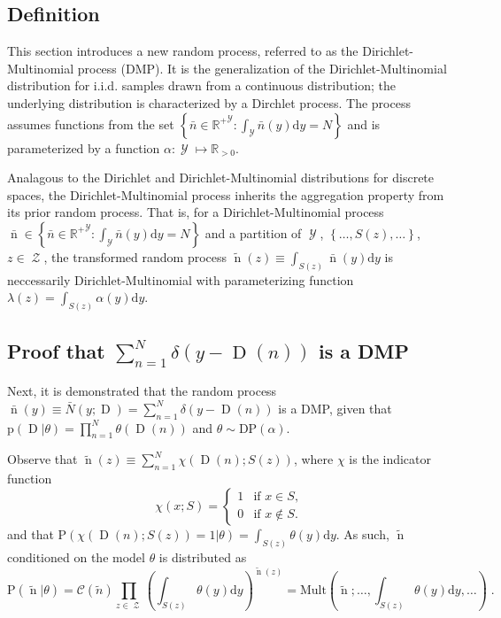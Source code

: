 \documentclass[12pt]{report}
\DeclareMathOperator{\Drm}{\mathrm{D}}
\DeclareMathOperator{\nrm}{\mathrm{n}}
\DeclareMathOperator{\Ycal}{\mathcal{Y}}
\DeclareMathOperator{\Zcal}{\mathcal{Z}}
\begin{document}
\subsection{Definition}

This section introduces a new random process, referred to as the Dirichlet-Multinomial process (DMP). It is the generalization of the Dirichlet-Multinomial distribution for i.i.d. samples drawn from a continuous distribution; the underlying distribution is characterized by a Dirchlet process. The process assumes functions from the set $\left\{ \bar{n} \in {\mathbb{R}^+}^{\Ycal} : \int_{\Ycal} \bar{n}(y) \mathrm{d} y = N \right\}$ and is parameterized by a function $\alpha : \Ycal \mapsto \mathbb{R}_{>0}$.

Analagous to the Dirichlet and Dirichlet-Multinomial distributions for discrete spaces, the Dirichlet-Multinomial process inherits the aggregation property from its prior random process. That is, for a Dirichlet-Multinomial process $\bar{\nrm} \in \left\{ \bar{n} \in {\mathbb{R}^+}^{\Ycal} : \int_{\Ycal} \bar{n}(y) \mathrm{d} y = N \right\}$ and a partition of $\Ycal$, $\left\{ \ldots,S(z),\ldots \right\}$, $z \in \Zcal$, the transformed random process $\tilde{\nrm}(z) \equiv \int_{S(z)} \bar{\nrm}(y) \mathrm{d} y$ is neccessarily Dirichlet-Multinomial with parameterizing function $\lambda(z) = \int_{S(z)} \alpha(y) \mathrm{d} y$.


\subsection{Proof that $\sum_{n=1}^N \delta(y-\Drm(n))$ is a DMP}

Next, it is demonstrated that the random process $\bar{\nrm}(y) \equiv \bar{N}(y;\Drm) = \sum_{n=1}^N \delta(y-\Drm(n))$ is a DMP, given that $\text{p}(\Drm|\theta) = \prod_{n=1}^N \theta(\Drm(n))$ and $\theta \sim \text{DP}(\alpha)$.

Observe that $\tilde{\nrm}(z) \equiv \sum_{n=1}^N \chi(\Drm(n);S(z))$, where $\chi$ is the indicator function
\begin{equation}
\chi(x;S) = \begin{cases} 1 & \text{if } x \in S, \\ 0 & \text{if } x \notin S.  \end{cases}
\end{equation}
and that $\text{P}(\chi(\Drm(n);S(z)) = 1 | \theta) = \int_{S(z)} \theta(y) \mathrm{d} y$. As such, $\tilde{\nrm}$ conditioned on the model $\theta$ is distributed as 
\begin{equation}
\text{P}(\tilde{\nrm} | \theta) = \mathcal{C}(\tilde{n}) \prod_{z \in \Zcal} \left( \int_{S(z)} \theta(y) \mathrm{d} y \right)^{\tilde{\nrm}(z)} = \text{Mult}\left( \tilde{\nrm} ; \ldots,\int_{S(z)} \theta(y) \mathrm{d} y,\ldots \right)  \;.
\end{equation}
\end{document}
